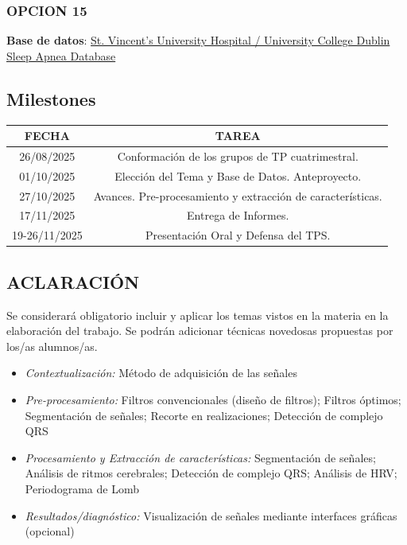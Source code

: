\documentclass[10pt]{article}
\begin{document}
\subsubsection*{OPCION 15}

\textbf{Base de datos}: \href{https://physionet.org/content/ucddb/1.0.0/}{St. Vincent's University Hospital / University College Dublin Sleep Apnea Database}


\subsection*{Milestones}

\begin{table}[h]
\begin{tabular}{|c|c|}
\hline
\textbf{FECHA} & \textbf{TAREA} \\ \hline
26/08/2025 & Conformación de los grupos de TP cuatrimestral. \\ \hline
01/10/2025 & Elección del Tema y Base de Datos. Anteproyecto. \\ \hline
27/10/2025 & Avances. Pre-procesamiento y extracción de características. \\ \hline
17/11/2025 & Entrega de Informes. \\ \hline
19-26/11/2025 & Presentación Oral y Defensa del TPS. \\ \hline
\end{tabular}
\end{table}

\subsection*{ACLARACIÓN}

Se considerará obligatorio incluir y aplicar los temas vistos en la materia en la elaboración del trabajo. Se podrán adicionar técnicas novedosas propuestas por los/as alumnos/as. 

\begin{itemize}
    \item \textit{Contextualización:} Método de adquisición de las señales
    \item \textit{Pre-procesamiento:} Filtros convencionales (diseño de filtros); Filtros óptimos; Segmentación de señales; Recorte en realizaciones; Detección de complejo QRS
    \item \textit{Procesamiento y Extracción de características:} Segmentación de señales; Análisis de ritmos cerebrales; Detección de complejo QRS; Análisis de HRV; Periodograma de Lomb
    \item \textit{Resultados/diagnóstico:} Visualización de señales mediante interfaces gráficas (opcional)
\end{itemize}
\end{document}
